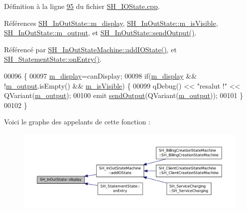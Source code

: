 Définition à la ligne \hyperlink{SH__IOState_8cpp_source_l00095}{95} du fichier \hyperlink{SH__IOState_8cpp_source}{S\-H\-\_\-\-I\-O\-State.\-cpp}.



Références \hyperlink{classSH__InOutState_a3351fa53593266a1ae4334d33d0b1610}{S\-H\-\_\-\-In\-Out\-State\-::m\-\_\-display}, \hyperlink{classSH__InOutState_a8fd66b185c9a55f0e84daa97e2acf53a}{S\-H\-\_\-\-In\-Out\-State\-::m\-\_\-is\-Visible}, \hyperlink{classSH__InOutState_ae735e741ce229d2600448d8daa0abc2d}{S\-H\-\_\-\-In\-Out\-State\-::m\-\_\-output}, et \hyperlink{classSH__InOutState_ad40e929a5537eb1d4883d5aa6eee5b15}{S\-H\-\_\-\-In\-Out\-State\-::send\-Output()}.



Référencé par \hyperlink{classSH__InOutStateMachine_ad6b778d052f741daee720c047059ce0e}{S\-H\-\_\-\-In\-Out\-State\-Machine\-::add\-I\-O\-State()}, et \hyperlink{classSH__StatementState_ac62f9c27b2966034e56762a6e532dbe4}{S\-H\-\_\-\-Statement\-State\-::on\-Entry()}.


\begin{DoxyCode}
00096 \{
00097     \hyperlink{classSH__InOutState_a3351fa53593266a1ae4334d33d0b1610}{m\_display}=canDisplay;
00098     \textcolor{keywordflow}{if}(\hyperlink{classSH__InOutState_a3351fa53593266a1ae4334d33d0b1610}{m\_display} && !\hyperlink{classSH__InOutState_ae735e741ce229d2600448d8daa0abc2d}{m\_output}.isEmpty() && \hyperlink{classSH__InOutState_a8fd66b185c9a55f0e84daa97e2acf53a}{m\_isVisible}) \{
00099         qDebug() << \textcolor{stringliteral}{"resalut !"} << QVariant(\hyperlink{classSH__InOutState_ae735e741ce229d2600448d8daa0abc2d}{m\_output});
00100         emit \hyperlink{classSH__InOutState_ad40e929a5537eb1d4883d5aa6eee5b15}{sendOutput}(QVariant(\hyperlink{classSH__InOutState_ae735e741ce229d2600448d8daa0abc2d}{m\_output}));
00101     \}
00102 \}
\end{DoxyCode}


Voici le graphe des appelants de cette fonction \-:
\nopagebreak
\begin{figure}[H]
\begin{center}
\leavevmode
\includegraphics[width=350pt]{classSH__InOutState_a918e8a7f5fe00dc16004e46eeee1281d_icgraph}
\end{center}
\end{figure}


